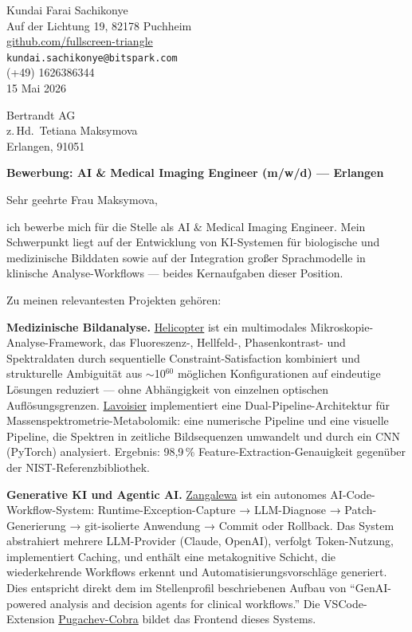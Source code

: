 \documentclass[12pt,a4paper]{article}
\begin{document}
\begin{flushright}
Kundai Farai Sachikonye \\
Auf der Lichtung 19, 82178 Puchheim \\
\href{https://github.com/fullscreen-triangle}{github.com/fullscreen-triangle} \\
\texttt{kundai.sachikonye@bitspark.com} \\
(+49) 1626386344 \\[6pt]
15 Mai 2026
\end{flushright}

\vspace{1em}

Bertrandt AG \\
z.\,Hd.\ Tetiana Maksymova \\
Erlangen, 91051

\vspace{1.5em}

\textbf{Bewerbung: AI \& Medical Imaging Engineer (m/w/d) --- Erlangen}

\vspace{1em}

Sehr geehrte Frau Maksymova,

ich bewerbe mich für die Stelle als AI \& Medical Imaging Engineer.
Mein Schwerpunkt liegt auf der Entwicklung von KI-Systemen für biologische und
medizinische Bilddaten sowie auf der Integration großer Sprachmodelle in klinische
Analyse-Workflows --- beides Kernaufgaben dieser Position.

Zu meinen relevantesten Projekten gehören:

\textbf{Medizinische Bildanalyse.}
\href{https://github.com/fullscreen-triangle/helicopter}{Helicopter} ist ein
multimodales Mikroskopie-Analyse-Framework, das Fluoreszenz-, Hellfeld-,
Phasenkontrast- und Spektraldaten durch sequentielle Constraint-Satisfaction
kombiniert und strukturelle Ambiguität aus $\sim$10$^{60}$ möglichen Konfigurationen
auf eindeutige Lösungen reduziert --- ohne Abhängigkeit von einzelnen optischen
Auflösungsgrenzen.
\href{https://github.com/fullscreen-triangle/lavoisier}{Lavoisier} implementiert
eine Dual-Pipeline-Architektur für Massenspektrometrie-Metabolomik: eine numerische
Pipeline und eine visuelle Pipeline, die Spektren in zeitliche Bildsequenzen umwandelt
und durch ein CNN (PyTorch) analysiert. Ergebnis: 98,9\,\% Feature-Extraction-Genauigkeit
gegenüber der NIST-Referenzbibliothek.

\textbf{Generative KI und Agentic AI.}
\href{https://github.com/fullscreen-triangle/zangalewa}{Zangalewa} ist ein
autonomes AI-Code-Workflow-System: Runtime-Exception-Capture → LLM-Diagnose →
Patch-Generierung → git-isolierte Anwendung → Commit oder Rollback. Das System
abstrahiert mehrere LLM-Provider (Claude, OpenAI), verfolgt Token-Nutzung,
implementiert Caching, und enthält eine metakognitive Schicht, die wiederkehrende
Workflows erkennt und Automatisierungsvorschläge generiert. Dies entspricht direkt
dem im Stellenprofil beschriebenen Aufbau von ``GenAI-powered analysis and decision
agents for clinical workflows.'' Die VSCode-Extension
\href{https://github.com/fullscreen-triangle/pugachev-cobra}{Pugachev-Cobra}
bildet das Frontend dieses Systems.
\end{document}

